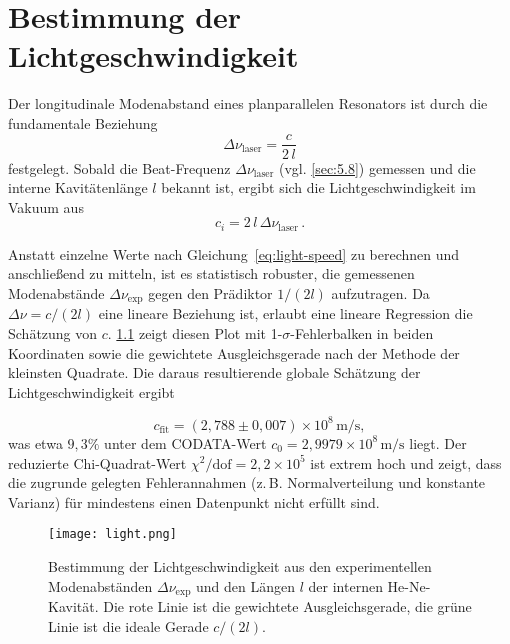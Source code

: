  
\chapter{Bestimmung der Lichtgeschwindigkeit}

Der longitudinale Modenabstand eines planparallelen Resonators ist durch die fundamentale Beziehung  
\begin{equation*}
  \Delta\nu_{\mathrm{laser}} = \frac{c}{2\,l}
\end{equation*}
festgelegt. 
Sobald die Beat-Frequenz \(\Delta\nu_{\mathrm{laser}}\) (vgl. \cref{sec:5.8}) gemessen und die interne Kavitätenlänge \(l\) bekannt ist, ergibt sich die Lichtgeschwindigkeit im Vakuum aus  
\begin{equation} \label{eq:light-speed}
  c_i = 2\,l\,\Delta\nu_{\mathrm{laser}}\,.
\end{equation}

Anstatt einzelne Werte nach Gleichung~\eqref{eq:light-speed} zu berechnen und anschließend zu mitteln, ist es statistisch robuster, die gemessenen Modenabstände \(\Delta\nu_{\mathrm{exp}}\) gegen den Prädiktor \(1/(2l)\) aufzutragen. 
Da \(\Delta\nu = c/(2l)\) eine lineare Beziehung ist, erlaubt eine lineare Regression die Schätzung von \(c\). 
\cref{fig:light-speed} zeigt diesen Plot mit 1-\(\sigma\)-Fehlerbalken in beiden Koordinaten sowie die gewichtete Ausgleichsgerade nach der Methode der kleinsten Quadrate. Die daraus resultierende globale Schätzung der Lichtgeschwindigkeit ergibt  

\[
  c_{\mathrm{fit}} = (2{,}788 \pm 0{,}007)\times10^{8}\,\mathrm{m/s},
\]  
was etwa \(9{,}3\%\) unter dem CODATA-Wert \(c_0 = 2{,}9979\times10^{8}\,\mathrm{m/s}\) liegt. Der reduzierte Chi-Quadrat-Wert  
\(\chi^2/\mathrm{dof} = 2{,}2\times10^5\)  
ist extrem hoch und zeigt, dass die zugrunde gelegten Fehlerannahmen (z.\,B. Normalverteilung und konstante Varianz) für mindestens einen Datenpunkt nicht erfüllt sind.

\begin{figure}
  \centering
  \texttt{[image: light.png]}
  \caption{Bestimmung der Lichtgeschwindigkeit aus den experimentellen Modenabständen \(\Delta\nu_{\mathrm{exp}}\) und den Längen \(l\) der internen He-Ne-Kavität. Die rote Linie ist die gewichtete Ausgleichsgerade, die grüne Linie ist die ideale Gerade \(c/(2l)\).}
  \label{fig:light-speed}
\end{figure}

